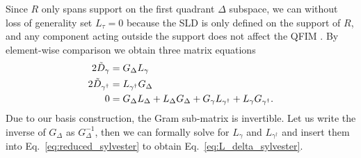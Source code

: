 \documentclass[reprint,amsmath,amssymb,aps,prl,floatfix,groupedaddress,superscriptaddress]{revtex4-2}
\begin{document}
Since $R$ only spans support on the first quadrant $\Delta$ subspace, we can without loss of generality set $L_{\tau} = 0$ because the SLD is only defined on the support of $R$, and any component acting outside the support does not affect the QFIM \cite{liu2020quantum}. By element-wise comparison we obtain three matrix equations
\begin{align}
    2 \Tilde{D}_\gamma &= G_\Delta L_\gamma \\
    2 \Tilde{D}_{\gamma^\dagger} &= L_{\gamma^\dagger} G_\Delta \\
    0 & = G_\Delta L_\Delta + L_\Delta G_\Delta + G_\gamma L_{\gamma^\dagger} + L_\gamma G_{\gamma^\dagger}.\label{eq:reduced_sylvester}
\end{align}
Due to our basis construction, the Gram sub-matrix is invertible. Let us write the inverse of $G_\Delta$ as $G^{-1}_\Delta$, then we can formally solve for $L_\gamma$ and $L_{\gamma^\dagger}$ and insert them into Eq.~\eqref{eq:reduced_sylvester} to obtain Eq.~\eqref{eq:L_delta_sylvester}.
\end{document}
